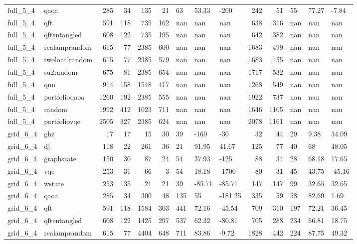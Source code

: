 \begin{longtable}{llrrrrlllrrlll}
full\_5\_4 & qaoa & 285 & 34 & 135 & 21 & 63 & 53.33 & -200 & 242 & 51 & 55 & 77.27 & -7.84 \\
full\_5\_4 & qft & 591 & 118 & 735 & 162 & nan & nan & nan & 638 & 316 & nan & nan & nan \\
full\_5\_4 & qftentangled & 608 & 122 & 735 & 195 & nan & nan & nan & 642 & 382 & nan & nan & nan \\
full\_5\_4 & realamprandom & 615 & 77 & 2385 & 600 & nan & nan & nan & 1683 & 499 & nan & nan & nan \\
full\_5\_4 & twolocalrandom & 615 & 77 & 2385 & 579 & nan & nan & nan & 1683 & 455 & nan & nan & nan \\
full\_5\_4 & su2random & 675 & 81 & 2385 & 654 & nan & nan & nan & 1717 & 532 & nan & nan & nan \\
full\_5\_4 & qnn & 914 & 158 & 1548 & 417 & nan & nan & nan & 1268 & 549 & nan & nan & nan \\
full\_5\_4 & portfolioqaoa & 1260 & 192 & 2385 & 555 & nan & nan & nan & 1922 & 737 & nan & nan & nan \\
full\_5\_4 & random & 1992 & 412 & 1023 & 711 & nan & nan & nan & 1646 & 1105 & nan & nan & nan \\
full\_5\_4 & portfoliovqe & 2505 & 327 & 2385 & 624 & nan & nan & nan & 2078 & 1161 & nan & nan & nan \\
grid\_6\_4 & ghz & 17 & 17 & 15 & 30 & 39 & -160 & -30 & 32 & 44 & 29 & 9.38 & 34.09 \\
grid\_6\_4 & dj & 118 & 22 & 261 & 36 & 21 & 91.95 & 41.67 & 125 & 77 & 40 & 68 & 48.05 \\
grid\_6\_4 & graphstate & 150 & 30 & 87 & 24 & 54 & 37.93 & -125 & 88 & 34 & 28 & 68.18 & 17.65 \\
grid\_6\_4 & vqe & 253 & 31 & 66 & 3 & 54 & 18.18 & -1700 & 80 & 31 & 45 & 43.75 & -45.16 \\
grid\_6\_4 & wstate & 253 & 135 & 21 & 21 & 39 & -85.71 & -85.71 & 147 & 147 & 99 & 32.65 & 32.65 \\
grid\_6\_4 & qaoa & 285 & 34 & 300 & 48 & 135 & 55 & -181.25 & 335 & 59 & 58 & 82.69 & 1.69 \\
grid\_6\_4 & qft & 591 & 118 & 1584 & 303 & 441 & 72.16 & -45.54 & 709 & 310 & 197 & 72.21 & 36.45 \\
grid\_6\_4 & qftentangled & 608 & 122 & 1425 & 297 & 537 & 62.32 & -80.81 & 705 & 288 & 234 & 66.81 & 18.75 \\
grid\_6\_4 & realamprandom & 615 & 77 & 4404 & 648 & 711 & 83.86 & -9.72 & 1828 & 442 & 224 & 87.75 & 49.32 \\

\end{longtable}
